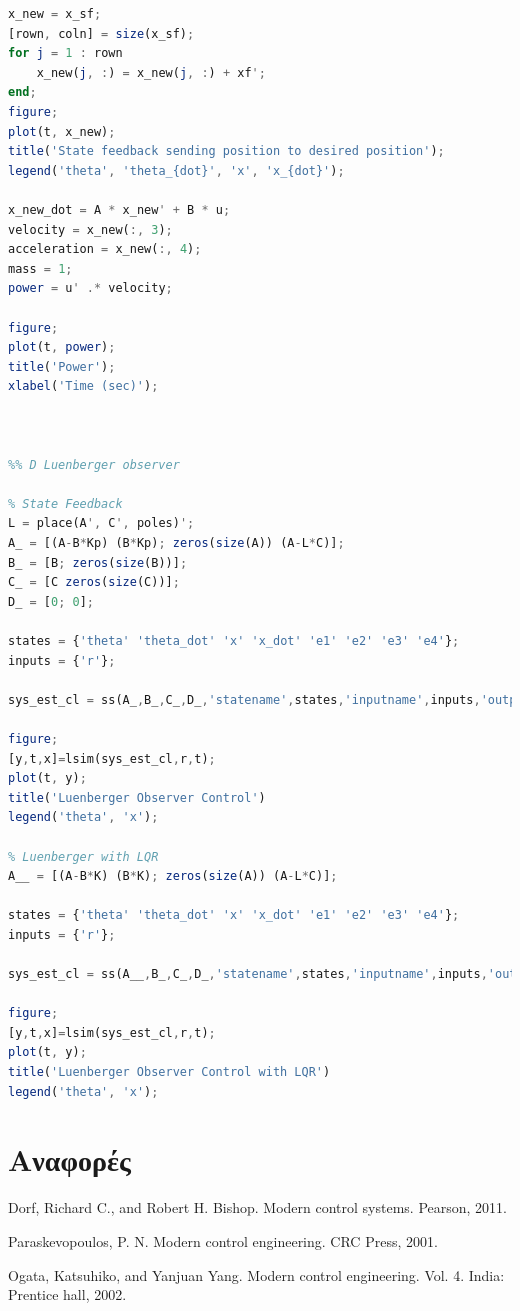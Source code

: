 \documentclass[a4paper,oneside, 12pt]{article}
\begin{document}
\begin{lstlisting}[language=Octave]
x_new = x_sf;
[rown, coln] = size(x_sf);
for j = 1 : rown
    x_new(j, :) = x_new(j, :) + xf';
end;
figure;
plot(t, x_new);
title('State feedback sending position to desired position');
legend('theta', 'theta_{dot}', 'x', 'x_{dot}');

x_new_dot = A * x_new' + B * u;
velocity = x_new(:, 3);
acceleration = x_new(:, 4);
mass = 1;
power = u' .* velocity;

figure;
plot(t, power);
title('Power');
xlabel('Time (sec)');



%% D Luenberger observer

% State Feedback
L = place(A', C', poles)';
A_ = [(A-B*Kp) (B*Kp); zeros(size(A)) (A-L*C)];
B_ = [B; zeros(size(B))];
C_ = [C zeros(size(C))];
D_ = [0; 0];

states = {'theta' 'theta_dot' 'x' 'x_dot' 'e1' 'e2' 'e3' 'e4'};
inputs = {'r'};

sys_est_cl = ss(A_,B_,C_,D_,'statename',states,'inputname',inputs,'outputname',outputs);

figure;
[y,t,x]=lsim(sys_est_cl,r,t);
plot(t, y);
title('Luenberger Observer Control')
legend('theta', 'x');

% Luenberger with LQR 
A__ = [(A-B*K) (B*K); zeros(size(A)) (A-L*C)];

states = {'theta' 'theta_dot' 'x' 'x_dot' 'e1' 'e2' 'e3' 'e4'};
inputs = {'r'};

sys_est_cl = ss(A__,B_,C_,D_,'statename',states,'inputname',inputs,'outputname',outputs);

figure;
[y,t,x]=lsim(sys_est_cl,r,t);
plot(t, y);
title('Luenberger Observer Control with LQR')
legend('theta', 'x');
\end{lstlisting}




\section*{Αναφορές}

\noindent [1] Dorf, Richard C., and Robert H. Bishop. Modern control systems. Pearson, 2011.

\noindent [2] Paraskevopoulos, P. N. Modern control engineering. CRC Press, 2001.

\noindent [3] Ogata, Katsuhiko, and Yanjuan Yang. Modern control engineering. Vol. 4. India: Prentice hall, 2002.
\end{document}

